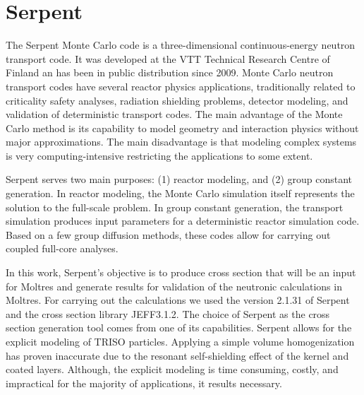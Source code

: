 \documentclass[11pt,letterpaper]{article}
\begin{document}



\section{Serpent}

The Serpent Monte Carlo code \cite{leppanen_development_2007} \cite{leppanen_calculation_2014} is a three-dimensional continuous-energy neutron transport code.
It was developed at the VTT Technical Research Centre of Finland an has been in public distribution since 2009.
Monte Carlo neutron transport codes have several reactor physics applications, traditionally related to criticality safety analyses, radiation shielding problems, detector modeling, and validation of deterministic transport codes.
The main advantage of the Monte Carlo method is its capability to model geometry and interaction physics without major approximations.
The main disadvantage is that modeling complex systems is very computing-intensive restricting the applications to some extent.

Serpent serves two main purposes: (1) reactor modeling, and (2) group constant generation.
In reactor modeling, the Monte Carlo simulation itself represents the solution to the full-scale problem.
In group constant generation, the transport simulation produces input parameters for a deterministic reactor simulation code.
Based on a few group diffusion methods, these codes allow for carrying out coupled full-core analyses.

In this work, Serpent’s objective is to produce cross section that will be an input for Moltres and generate results for validation of the neutronic calculations in Moltres.
For carrying out the calculations we used the version 2.1.31 of Serpent and the cross section library JEFF3.1.2.
The choice of Serpent as the cross section generation tool comes from one of its capabilities.
Serpent allows for the explicit modeling of TRISO particles.
Applying a simple volume homogenization has proven inaccurate due to the resonant self-shielding effect of the kernel and coated layers.
Although, the explicit modeling is time consuming, costly, and impractical for the majority of applications, it results necessary.
\end{document}
